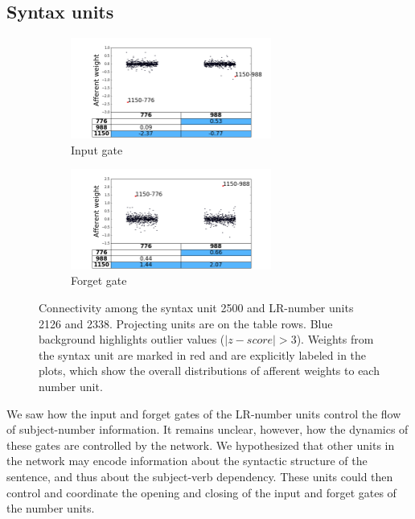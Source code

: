 \subsection{Syntax units}
\label{sec:syntax-units}

\begin{figure}[ht]
    \centering
    \begin{subfigure}{0.49\textwidth}
            \centering
            \includegraphics[height=3.3cm,width=\textwidth]{Figures/gate_Input_afferent_interactions.png}
            \caption{Input gate}
            \label{fig:interaction-input}
    \end{subfigure}
    \begin{subfigure}{0.49\textwidth}
           \centering
          \includegraphics[height=3.3cm,width=\textwidth]{Figures/gate_Forget_afferent_interactions.png}
          \caption{Forget gate}
          \label{fig:interaction-forget}
    \end{subfigure}
    \caption{Connectivity among the syntax unit \unit{2}{500} and
      LR-number units \unit{2}{126} and \unit{2}{338}. Projecting
      units are on the table rows. Blue background highlights outlier
      values ($|z-score|>3$). Weights from the syntax unit are marked in red
      and are explicitly labeled in the plots, which show the overall distributions of afferent weights to each number unit.}
\label{fig:interaction}
\end{figure}

We saw how the input and forget gates of the LR-number units control the flow of subject-number information. It remains unclear, however, how the dynamics of these gates are controlled by the network. We hypothesized that other units in the network may encode information about the syntactic structure of the sentence, and thus about the subject-verb dependency. These units could then control and coordinate the opening and closing of the input and forget gates of the number units. 

